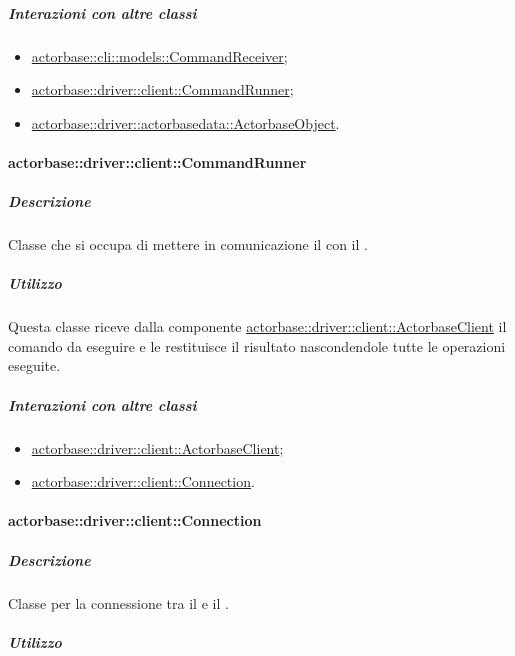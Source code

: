 \documentclass{scalatekids-article}
\begin{document}
\subparagraph{Interazioni con altre classi}

\begin{itemize}
\item \hyperref[sec:actorbase::cli::models::CommandReceiver]{actorbase::cli::models::CommandReceiver};
\item \hyperref[sec:actorbase::driver::client::CommandRunner]{actorbase::driver::client::CommandRunner};
\item \hyperref[sec:actorbase::driver::actorbasedata::ActorbaseObject]{actorbase::driver::actorbasedata::ActorbaseObject}.
\end{itemize}

\paragraph{actorbase::driver::client::CommandRunner}
\label{sec:actorbase::driver::client::CommandRunner}

\subparagraph{Descrizione}

Classe  che si occupa di mettere in comunicazione il
 con il .

\subparagraph{Utilizzo}

Questa classe riceve dalla componente \hyperref[sec:actorbase::driver::client::ActorbaseClient]{actorbase::driver::client::ActorbaseClient}
il comando da eseguire e le restituisce il risultato nascondendole
tutte le operazioni eseguite.

\subparagraph{Interazioni con altre classi}

\begin{itemize}
\item \hyperref[sec:actorbase::driver::client::ActorbaseClient]{actorbase::driver::client::ActorbaseClient};
\item \hyperref[sec:actorbase::driver::client::Connection]{actorbase::driver::client::Connection}.
\end{itemize}

\paragraph{actorbase::driver::client::Connection}
\label{sec:actorbase::driver::client::Connection}

\subparagraph{Descrizione}

Classe per la connessione tra il  e il .

\subparagraph{Utilizzo}
\end{document}
